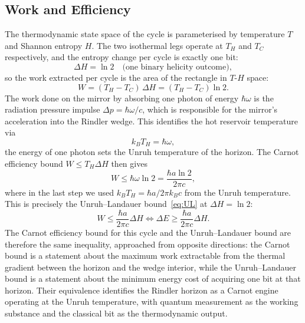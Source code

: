 \documentclass[12pt,a4paper]{article}
\begin{document}
\subsection{Work and Efficiency}

The thermodynamic state space of the cycle is parameterised 
by temperature $T$ and Shannon entropy $H$. The two 
isothermal legs operate at $T_H$ and $T_C$ respectively, 
and the entropy change per cycle is exactly one bit:
%
\begin{equation}
\Delta H = \ln 2 \quad \text{(one binary helicity outcome)},
\end{equation}
%
so the work extracted per cycle is the area of the rectangle 
in $T$-$H$ space:
%
\begin{equation}
W = (T_H - T_C)\,\Delta H = (T_H - T_C)\ln 2.
\label{eq:carnot_work}
\end{equation}
%
The work done on the mirror by absorbing one photon of energy 
$\hbar\omega$ is the radiation pressure impulse $\Delta p = 
\hbar\omega/c$, which is responsible for the mirror's 
acceleration into the Rindler wedge. This identifies the hot 
reservoir temperature via
%
\begin{equation}
k_BT_H = \hbar\omega,
\label{eq:TH}
\end{equation}
%
the energy of one photon sets the Unruh temperature of the 
horizon. The Carnot efficiency bound $W \leq T_H\Delta H$ 
then gives
%
\begin{equation}
W \leq \hbar\omega\ln 2 = \frac{\hbar a \ln 2}{2\pi c},
\label{eq:carnot_bound}
\end{equation}
%
where in the last step we used $k_BT_H = \hbar a/2\pi k_Bc$ 
from the Unruh temperature. This is precisely the 
Unruh--Landauer bound~\eqref{eq:UL} at $\Delta H = \ln 2$:
%
\begin{equation}
\boxed{W \leq \frac{\hbar a}{2\pi c}\Delta H 
\iff \Delta E \geq \frac{\hbar a}{2\pi c}\Delta H.}
\label{eq:carnot_UL}
\end{equation}
%
The Carnot efficiency bound for this cycle and the 
Unruh--Landauer bound are therefore the same inequality, 
approached from opposite directions: the Carnot bound is a 
statement about the maximum work extractable from the thermal 
gradient between the horizon and the wedge interior, while 
the Unruh--Landauer bound is a statement about the minimum 
energy cost of acquiring one bit at that horizon. Their 
equivalence identifies the Rindler horizon as a Carnot engine 
operating at the Unruh temperature, with quantum measurement 
as the working substance and the classical bit as the 
thermodynamic output.
\end{document}
